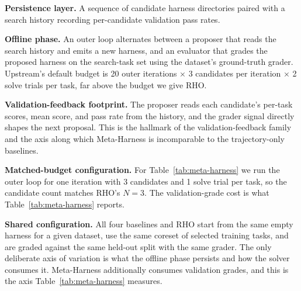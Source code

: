 \documentclass{llmxive}
\providecommand{\method}{\textsc{RHO}}
\begin{document}
\noindent\textbf{Persistence layer.}
A sequence of candidate harness directories paired with a search history recording per-candidate validation pass rates.

\noindent\textbf{Offline phase.}
An outer loop alternates between a proposer that reads the search history and emits a new harness, and an evaluator that grades the proposed harness on the search-task set using the dataset's ground-truth grader.
Upstream's default budget is 20 outer iterations $\times$ 3 candidates per iteration $\times$ 2 solve trials per task, far above the budget we give \method{}.

\noindent\textbf{Validation-feedback footprint.}
The proposer reads each candidate's per-task scores, mean score, and pass rate from the history, and the grader signal directly shapes the next proposal.
This is the hallmark of the validation-feedback family and the axis along which Meta-Harness is incomparable to the trajectory-only baselines.

\noindent\textbf{Matched-budget configuration.}
For Table~\ref{tab:meta-harness} we run the outer loop for one iteration with 3 candidates and 1 solve trial per task, so the candidate count matches \method{}'s $N=3$.
The validation-grade cost is what Table~\ref{tab:meta-harness} reports.

\noindent\textbf{Shared configuration.}
All four baselines and \method{} start from the same empty harness for a given dataset, use the same coreset of selected training tasks, and are graded against the same held-out split with the same grader.
The only deliberate axis of variation is what the offline phase persists and how the solver consumes it.
Meta-Harness additionally consumes validation grades, and this is the axis Table~\ref{tab:meta-harness} measures.
\end{document}
